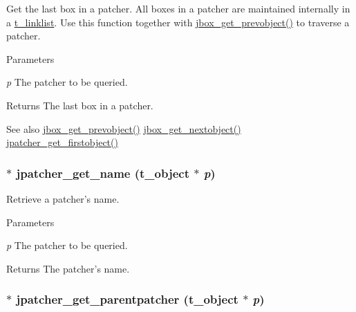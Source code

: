 Get the last box in a patcher. All boxes in a patcher are maintained internally in a \hyperlink{structt__linklist}{t\_\-linklist}. Use this function together with \hyperlink{group__jbox_ga99be7a7b57c38335d30e6241afb86a5b}{jbox\_\-get\_\-prevobject()} to traverse a patcher.


\begin{DoxyParams}{Parameters}
\item[{\em p}]The patcher to be queried. \end{DoxyParams}
\begin{DoxyReturn}{Returns}
The last box in a patcher. 
\end{DoxyReturn}
\begin{DoxySeeAlso}{See also}
\hyperlink{group__jbox_ga99be7a7b57c38335d30e6241afb86a5b}{jbox\_\-get\_\-prevobject()} \hyperlink{group__jbox_ga89177ab12d45649c7209e65c97a3b128}{jbox\_\-get\_\-nextobject()} \hyperlink{group__jpatcher_gafd77f63d504807973a4ce400c304b174}{jpatcher\_\-get\_\-firstobject()} 
\end{DoxySeeAlso}
\hypertarget{group__jpatcher_ga245a38ac7814605e198466313884a246}{
\subsubsection[{jpatcher\_\-get\_\-name}]{$\ast$ jpatcher\_\-get\_\-name ({\bf t\_\-object} $\ast$ {\em p})}}
\label{group__jpatcher_ga245a38ac7814605e198466313884a246}


Retrieve a patcher's name. 
\begin{DoxyParams}{Parameters}
\item[{\em p}]The patcher to be queried. \end{DoxyParams}
\begin{DoxyReturn}{Returns}
The patcher's name. 
\end{DoxyReturn}
\hypertarget{group__jpatcher_ga337a58107a3555e2de7da75893840920}{
\subsubsection[{jpatcher\_\-get\_\-parentpatcher}]{$\ast$ jpatcher\_\-get\_\-parentpatcher ({\bf t\_\-object} $\ast$ {\em p})}}
\label{group__jpatcher_ga337a58107a3555e2de7da75893840920}


